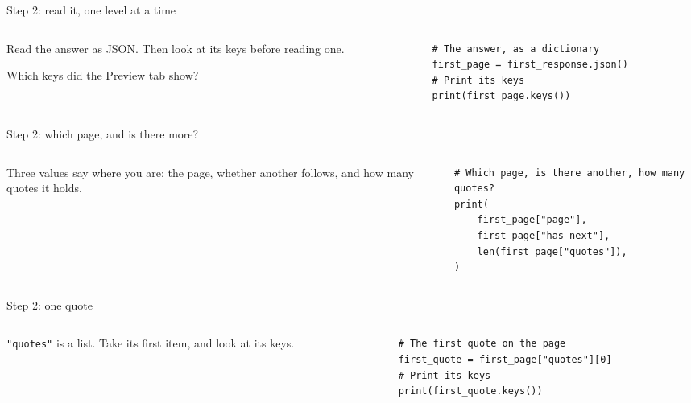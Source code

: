 \documentclass[9pt,aspectratio=169]{beamer}
\begin{document}
\begin{frame}[fragile]{Step 2: read it, one level at a time}
    \begin{columns}[T]
        \begin{column}{0.37\textwidth}
            Read the answer as JSON. Then look at its keys before reading one.

            \medskip
            Which keys did the Preview tab show?
        \end{column}
        \begin{column}{0.6\textwidth}
\begin{lstlisting}[style=lab]
# The answer, as a dictionary
first_page = first_response.json()
# Print its keys
print(first_page.keys())
\end{lstlisting}
        \end{column}
    \end{columns}
\end{frame}

\begin{frame}[fragile]{Step 2: which page, and is there more?}
    \begin{columns}[T]
        \begin{column}{0.37\textwidth}
            Three values say where you are: the page, whether another follows, and how many quotes it holds.
        \end{column}
        \begin{column}{0.6\textwidth}
\begin{lstlisting}[style=lab]
# Which page, is there another, how many quotes?
print(
    first_page["page"],
    first_page["has_next"],
    len(first_page["quotes"]),
)
\end{lstlisting}
        \end{column}
    \end{columns}
\end{frame}

\begin{frame}[fragile]{Step 2: one quote}
    \begin{columns}[T]
        \begin{column}{0.37\textwidth}
            \texttt{"quotes"} is a list. Take its first item, and look at its keys.
        \end{column}
        \begin{column}{0.6\textwidth}
\begin{lstlisting}[style=lab]
# The first quote on the page
first_quote = first_page["quotes"][0]
# Print its keys
print(first_quote.keys())
\end{lstlisting}
        \end{column}
    \end{columns}
\end{frame}
\end{document}
